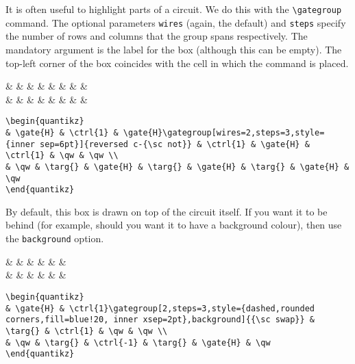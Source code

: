 \documentclass[aps,pra,10pt,nofootinbib]{revtex4}
\begin{document}
It is often useful to highlight parts of a circuit. We do this with the \verb!\gategroup! command. The optional parameters \verb!wires! (again, the default) and \verb!steps! specify the number of rows and columns that the group spans respectively. The mandatory argument is the label for the box (although this can be empty). The top-left corner of the box coincides with the cell in which the command is placed.
\begin{Code}
\begin{center}
\begin{quantikz}
&  &  &  &  &  &  & \qw & \qw \\
& \qw & \targ{} &  & \targ{} &  & \targ{} &  & \qw
\end{quantikz}
\end{center}
\tcblower
\begin{lstlisting}
\begin{quantikz}
& \gate{H} & \ctrl{1} & \gate{H}\gategroup[wires=2,steps=3,style={inner sep=6pt}]{reversed c-{\sc not}} & \ctrl{1} & \gate{H} & \ctrl{1} & \qw & \qw \\
& \qw & \targ{} & \gate{H} & \targ{} & \gate{H} & \targ{} & \gate{H} & \qw
\end{quantikz}
\end{lstlisting}
\end{Code}
By default, this box is drawn on top of the circuit itself. If you want it to be behind (for example, should you want it to have a background colour), then use the \verb!background! option.
\begin{Code}
\begin{center}
\begin{quantikz}
&  &  & \targ{} &  & \qw & \qw \\
& \qw & \targ{} &  & \targ{} &  & \qw
\end{quantikz}
\end{center}
\tcblower
\begin{lstlisting}
\begin{quantikz}
& \gate{H} & \ctrl{1}\gategroup[2,steps=3,style={dashed,rounded corners,fill=blue!20, inner xsep=2pt},background]{{\sc swap}} & \targ{} & \ctrl{1} & \qw & \qw \\
& \qw & \targ{} & \ctrl{-1} & \targ{} & \gate{H} & \qw
\end{quantikz}
\end{lstlisting}
\end{Code}
\end{document}
